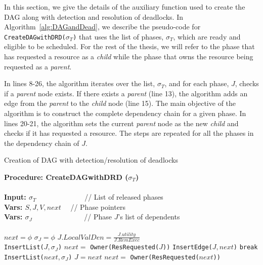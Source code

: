 \documentclass[12pt,dvips]{report}
\renewcommand{\baselinestretch}{1}
\begin{document}
In this section, we give the details of the auxiliary function used to create the DAG along with detection and resolution of deadlocks. In Algorithm~\ref{alg:DAGandDead}, we describe the pseudo-code for \texttt{CreateDAGwithDRD($\sigma_T$)} that uses the list of phases, $\sigma_T$, which are ready and eligible to be scheduled. For the rest of the thesis, we will refer to the phase that has requested a resource as a \textit{child} while the phase that owns the resource being requested as a \textit{parent}.

In lines 8-26, the algorithm iterates over the list, $\sigma_T$, and for each phase, $J$, checks if a \textit{parent} node exists. If there exists a \textit{parent} (line 13), the algorithm adds an edge from the \textit{parent} to the \textit{child} node (line 15). The main objective of the algorithm is to construct the complete dependency chain for a given phase. In lines 20-21, the algorithm sets the current \textit{parent} node as the new \textit{child} and checks if it has requested a resource. The steps are repeated for all the phases in the dependency chain of $J$.

\linesnumbered
\renewcommand{\baselinestretch}{1.0}
 \incmargin{1em}
\SetAlFnt{\footnotesize}
\begin{algorithm2e}[!t]
\begin{footnotesize}
    \caption{Creation of DAG with detection/resolution of deadlocks}
    \label{alg:DAGandDead}
    \textbf{Procedure: CreateDAGwithDRD ($\sigma_T$)} \\
    ~\\
    \textbf{Input: $\sigma_T$}  ~~~~~~~~~~~~~// List of released phases \\
    \textbf{Vars: $S, J, V, next$} ~~// Phase pointers \\
    \textbf{Vars: $\sigma_J$} ~~~~~~~~~~~~~~// Phase $J$'s list of dependents\\
    ~\\
   	$next = \phi$\;
     {
     	$\sigma_{J} = \phi$ \;
     	$J.LocalValDen = \frac{J.utility}{J.RemExec}$\;
     	~\\
      	\texttt{InsertList($J, \sigma_J$)}\;
     	$next =$ \texttt{Owner(\texttt{ResRequested($J$)})}\;
 		 {
			\texttt{InsertEdge($J, next$)} \;
			 {
				\texttt{break}\;
			}
			 {
				\texttt{InsertList($next, \sigma_J$)}\;
				$J = next$\;
		     	$next =$ \texttt{Owner(\texttt{ResRequested($next$)})}\;
			}
		}
	}
\end{footnotesize}
\end{algorithm2e}
\end{document}
